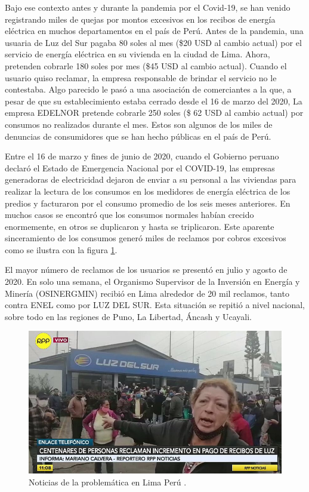 Bajo ese contexto antes y durante la pandemia por el Covid-19, se han venido registrando miles de quejas por montos excesivos en los recibos de energía eléctrica en muchos departamentos en el país de Perú. Antes de la pandemia, una usuaria de Luz del Sur pagaba 80 soles al mes (\$20 USD al cambio actual) por el servicio de energía eléctrica en su vivienda en la ciudad de Lima. Ahora, pretenden cobrarle 180 soles por mes (\$45 USD al cambio actual). Cuando el usuario quiso reclamar, la empresa responsable de brindar el servicio no le contestaba. Algo parecido le pasó a una asociación de comerciantes a la que, a pesar de que su establecimiento estaba cerrado desde el 16 de marzo del 2020, La empresa EDELNOR pretende cobrarle 250 soles (\$ 62 USD al cambio actual) por consumos no realizados durante el mes. Estos son algunos de los miles de denuncias de consumidores que se han hecho públicas en el país de Perú.

Entre el 16 de marzo y fines de junio de 2020, cuando el Gobierno peruano declaró el Estado de Emergencia Nacional por el COVID-19, las empresas generadoras de electricidad dejaron de enviar a su personal a las viviendas para realizar la lectura de los consumos en los medidores de energía eléctrica de los predios y facturaron por el consumo promedio de los seis meses anteriores. En muchos casos se encontró que los consumos normales habían crecido enormemente, en otros se duplicaron y hasta se triplicaron. Este aparente sinceramiento de los consumos generó miles de reclamos por cobros excesivos como se ilustra con la figura \ref{fig:noticia}. 

El mayor número de reclamos de los usuarios se presentó en julio y agosto de 2020. En solo una semana, el Organismo Supervisor de la Inversión en Energía y Minería (OSINERGMIN) recibió en Lima alrededor de 20 mil reclamos, tanto contra ENEL como por LUZ DEL SUR. Esta situación se repitió a nivel nacional, sobre todo en las regiones de Puno, La Libertad, Áncash y Ucayali.

\begin{figure}[htbp]
\centering
\includegraphics[width=.7\textwidth]{./Figures/motivacion.jpg}
\caption{Noticias de la problemática en Lima Perú \protect\footnotemark.}
\label{fig:noticia}
\end{figure}

